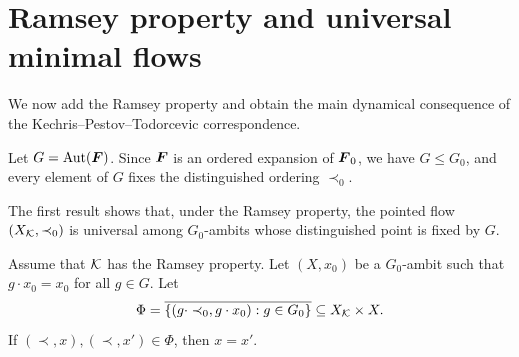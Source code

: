\section{Ramsey property and universal minimal flows}

We now add the Ramsey property and obtain the main dynamical consequence of the Kechris--Pestov--Todorcevic correspondence.

Let \(G=\operatorname{Aut}(\boldsymbol{F})\). Since \(\boldsymbol{F}\) is an ordered expansion of \(\boldsymbol{F}_0\),
we have \(G\leq G_0\),
and every element of \(G\) fixes the distinguished ordering \(\prec_0\).

The first result shows that, under the Ramsey property, the pointed flow
\((X_{\mathcal{K}},\prec_0)\)
is universal among \(G_0\)-ambits whose distinguished point is fixed by \(G\).

\begin{lemma}
    \label{lem:graph-uniqueness}
    Assume that \(\mathcal{K}\) has the Ramsey property. Let \((X,x_0)\) be a \(G_0\)-ambit
    such that \(g\cdot x_0=x_0\) for all \(g\in G\).
    Let
    \[
        \Phi
        =
        \overline{\{(g\cdot \prec_0,g\cdot x_0):g\in G_0\}}
        \subseteq X_{\mathcal{K}}\times X.
    \]
    If \((\prec,x),(\prec,x')\in \Phi\), then \(x=x'\).
\end{lemma}

